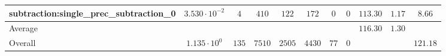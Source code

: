 \begin{tabular}{|l|c|c|c|c|c|c|c|c|c|c|}
subtraction:single\_prec\_subtraction\_0         & $ 3.530 \cdot 10^{-2} $ & $ 4      $ & $ 410  $ & $ 122  $ & $ 172   $ & $ 0  $ & $ 0 $ & $ 113.30      $ & $ 1.17    $ & $ 8.66    $ \\
\hline
Average                                          & $                     $ & $        $ & $      $ & $      $ & $       $ & $    $ & $   $ & $ 116.30      $ & $ 1.30    $ & $         $ \\
\hline
Overall                                          & $ 1.135 \cdot 10^{0}  $ & $ 135    $ & $ 7510 $ & $ 2505 $ & $ 4430  $ & $ 77 $ & $ 0 $ & $             $ & $         $ & $ 121.18  $ \\
\hline
\end{tabular}
